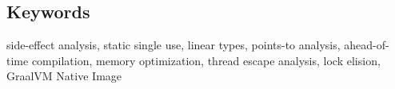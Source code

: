 \bigskip
\subsection*{Keywords}
side-effect analysis, static single use, linear types, points-to analysis, ahead-of-time compilation,
memory optimization, thread escape analysis, lock elision, GraalVM Native Image

\cleardoublepage

\pagestyle{plain}
\setcounter{tocdepth}{1}
\tableofcontents

\mainmatter
\pagestyle{scrheadings}
